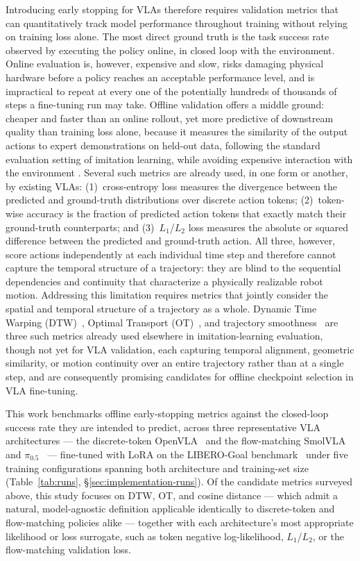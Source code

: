 \documentclass[english,12pt,a4paper,pdftex,elec,utf8]{aaltothesis}
\begin{document}
Introducing early stopping for VLAs therefore requires validation metrics that can quantitatively track
model performance throughout training without relying on training loss alone. The most direct ground
truth is the task success rate observed by executing the policy online, in closed loop with the
environment. Online evaluation is, however, expensive and slow, risks damaging physical hardware before a
policy reaches an acceptable performance level, and is impractical to repeat at every one of the
potentially hundreds of thousands of steps a fine-tuning run may take. Offline validation offers a
middle ground: cheaper and faster than an online rollout, yet more predictive of downstream quality than
training loss alone, because it measures the similarity of the output actions to expert demonstrations on held-out data, following the standard evaluation setting of imitation learning, while avoiding expensive interaction with the environment \cite{il}. Several such metrics are already used, in
one form or another, by existing VLAs: (1)~cross-entropy loss measures the divergence between the
predicted and ground-truth distributions over discrete action tokens; (2)~token-wise accuracy is
the fraction of predicted action tokens that exactly match their ground-truth counterparts; and
(3)~$L_1$/$L_2$ loss measures the absolute or squared difference between the predicted and
ground-truth action. All three, however, score actions independently at each individual time step and therefore cannot capture the temporal structure of
a trajectory: they are blind to the sequential dependencies and continuity that characterize a physically
realizable robot motion. Addressing this limitation requires metrics that jointly consider the spatial and
temporal structure of a trajectory as a whole. Dynamic Time Warping (DTW)~\cite{dtw_il}, Optimal Transport
(OT)~\cite{ot_il}, and trajectory smoothness~\cite{smoothness_il} are three such metrics already used
elsewhere in imitation-learning evaluation, though not yet for VLA validation, each capturing temporal alignment, geometric similarity, or
motion continuity over an entire trajectory rather than at a single step, and are consequently promising candidates for offline checkpoint
selection in VLA fine-tuning. 

This work benchmarks offline early-stopping metrics against the closed-loop success rate they are intended to predict, across three representative VLA architectures --- the discrete-token OpenVLA~\cite{kim2024openvla} and the flow-matching SmolVLA~\cite{shukor2025smolvla} and $\pi_{0.5}$~\cite{intelligence2025pi05} --- fine-tuned with LoRA on the LIBERO-Goal benchmark~\cite{liu2023libero} under five training configurations spanning both architecture and training-set size (Table~\ref{tab:runs}, \S\ref{sec:implementation-runs}). Of the candidate metrics surveyed above, this study focuses on DTW, OT, and cosine distance --- which admit a natural, model-agnostic definition applicable identically to discrete-token and flow-matching policies alike --- together with each architecture's most appropriate likelihood or loss surrogate, such as token negative log-likelihood, $L_1$/$L_2$, or the flow-matching validation loss. 
\end{document}

